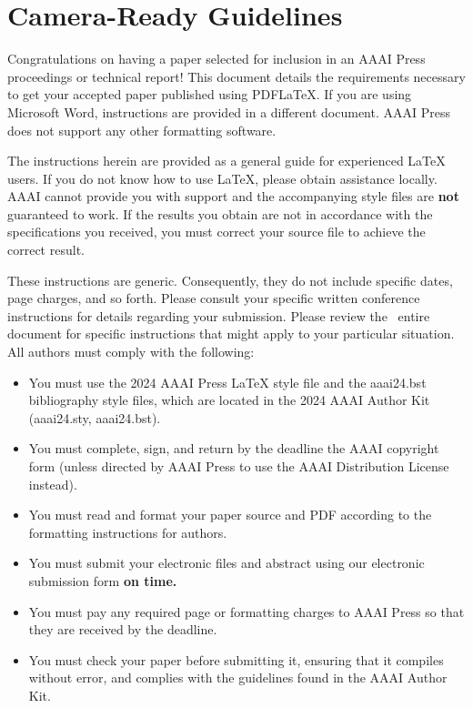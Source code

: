 \documentclass[letterpaper]{article} %
\begin{document}
{\section{Camera-Ready Guidelines}

Congratulations on having a paper selected for inclusion in an AAAI Press proceedings or technical report! This document details the requirements necessary to get your accepted paper published using PDF\LaTeX{}. If you are using Microsoft Word, instructions are provided in a different document. AAAI Press does not support any other formatting software.

The instructions herein are provided as a general guide for experienced \LaTeX{} users. If you do not know how to use \LaTeX{}, please obtain assistance locally. AAAI cannot provide you with support and the accompanying style files are \textbf{not} guaranteed to work. If the results you obtain are not in accordance with the specifications you received, you must correct your source file to achieve the correct result.

These instructions are generic. Consequently, they do not include specific dates, page charges, and so forth. Please consult your specific written conference instructions for details regarding your submission. Please review the  entire document for specific instructions that might apply to your particular situation. All authors must comply with the following:

\begin{itemize}
\item You must use the 2024 AAAI Press \LaTeX{} style file and the aaai24.bst bibliography style files, which are located in the 2024 AAAI Author Kit (aaai24.sty, aaai24.bst).
\item You must complete, sign, and return by the deadline the AAAI copyright form (unless directed by AAAI Press to use the AAAI Distribution License instead).
\item You must read and format your paper source and PDF according to the formatting instructions for authors.
\item You must submit your electronic files and abstract using our electronic submission form \textbf{on time.}
\item You must pay any required page or formatting charges to AAAI Press so that they are received by the deadline.
\item You must check your paper before submitting it, ensuring that it compiles without error, and complies with the guidelines found in the AAAI Author Kit.
\end{itemize}

}
\end{document}
